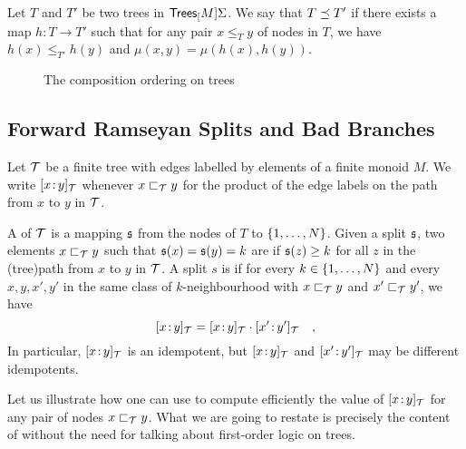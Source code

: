 \AP
\begin{definition}
    \label{composition-ordering:def}
    Let $T$ and $T'$ be two trees in $\mathsf{Trees}_{[}M]{\Sigma}$. We say that $T \preceq T'$
    if there exists a map $h \colon T \to T'$ such that
    for any pair $x \leq_T y$ of nodes in $T$,
    we have $h(x) \leq_{T'} h(y)$ and
    $\mu(x,y) = \mu(h(x), h(y))$.
\end{definition}



\begin{figure}
    \centering
    \caption{The composition ordering on trees}
    \label{composition-ordering:fig}
\end{figure}

\subsection{Forward Ramseyan Splits and Bad Branches}


\def\t{\aTree}

\AP Let $\t$ be a finite tree with edges labelled by elements of a finite
monoid $M$. We write $\tlbl{\t}{x}{y}$ whenever $x \treelt[\t] y$ for the
product of the edge labels on the path from $x$ to $y$ in $\t$.

A  of $\t$ is a mapping $\mathfrak{s}$ from the
nodes of $T$ to $\{ 1, \dots, N \}$. Given a split $\mathfrak{s}$, two elements $x
\treelt[\t] y$ such that $\mathfrak{s}(x) = \mathfrak{s}(y) = k$ are  if
$\mathfrak{s}(z) \geq k$ for all $z$ in the \kl(tree){path} from $x$ to $y$ in $\t$. A
split $s$ is  if for every $k \in \{ 1, \dots, N \}$ and
every $x, y, x', y'$ in the same class of $k$-neighbourhood with $x \treelt[\t] y$
and $x' \treelt[\t] y'$, we have 
\begin{equation} 
    \label{fake-idempotent:eq}
    \tlbl{\t}{x}{y} = \tlbl{\t}{x}{y} \cdot \tlbl{\t}{x'}{y'} \quad ,
\end{equation}
In particular, $\tlbl{\t}{x}{y}$ is an idempotent,
but $\tlbl{\t}{x}{y}$ and $\tlbl{\t}{x'}{y'}$ may be different idempotents.


Let us illustrate how one can use  to compute
efficiently the value of $\tlbl{\t}{x}{y}$ for any pair of nodes $x \treelt[\t]
y$. What we are going to restate is precisely the content of \cite[Lemma
3]{COLC07} without the need for talking about first-order logic on trees.

